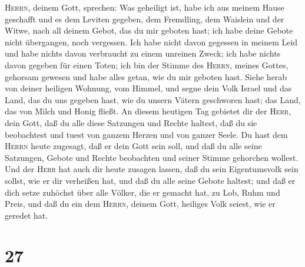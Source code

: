 \textsc{Herrn}, deinem Gott, sprechen: Was geheiligt ist, habe ich aus
meinem Hause geschafft und es dem Leviten gegeben, dem Fremdling, dem
Waislein und der Witwe, nach all deinem Gebot, das du mir geboten hast;
ich habe deine Gebote nicht übergangen, noch vergessen. 
Ich habe nicht davon gegessen in meinem Leid und habe nichts davon
verbraucht zu einem unreinen Zweck; ich habe nichts davon gegeben für
einen Toten; ich bin der Stimme des \textsc{Herrn}, meines Gottes,
gehorsam gewesen und habe alles getan, wie du mir geboten hast.
 Siehe herab von deiner heiligen Wohnung, vom Himmel, und
segne dein Volk Israel und das Land, das du uns gegeben hast, wie du
unsern Vätern geschworen hast; das Land, das von Milch und Honig fließt.
 An diesem heutigen Tag gebietet dir der \textsc{Herr},
dein Gott, daß du alle diese Satzungen und Rechte haltest, daß du sie
beobachtest und tuest von ganzem Herzen und von ganzer Seele.
 Du hast dem \textsc{Herrn} heute zugesagt, daß er dein
Gott sein soll, und daß du alle seine Satzungen, Gebote und Rechte
beobachten und seiner Stimme gehorchen wollest.  Und der
\textsc{Herr} hat auch dir heute zusagen lassen, daß du sein
Eigentumsvolk sein sollst, wie er dir verheißen hat, und daß du alle
seine Gebote haltest;  und daß er dich setze zuhöchst
über alle Völker, die er gemacht hat, zu Lob, Ruhm und Preis, und daß du
ein dem \textsc{Herrn}, deinem Gott, heiliges Volk seiest, wie er
geredet hat.

\hypertarget{section-26}{%
\section{27}\label{section-26}}

